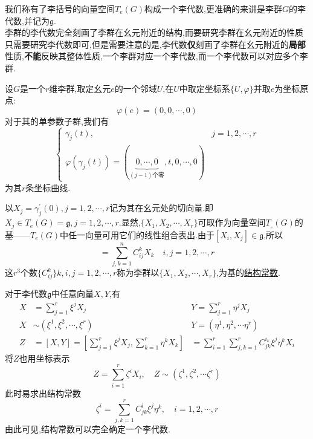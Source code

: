 我们称有了李括号的向量空间$T_e(G)$构成一个李代数,更准确的来讲是李群$G$的李代数,并记为$\mathfrak{g}$.\\
李群的李代数完全刻画了李群在幺元附近的结构,而要研究李群在幺元附近的性质只需要研究李代数即可,但是需要注意的是,李代数\textbf{仅}刻画了李群在幺元附近的\textbf{局部}性质,\textbf{不能}反映其整体性质,一个李群对应一个李代数,而一个李代数可以对应多个李群.
\begin{definition}[结构常数]
    设$G$是一个$r$维李群,取定幺元$e$的一个邻域$U$,在$U$中取定坐标系$\{U,\varphi\}$并取$e$为坐标原点:
    \begin{equation}
        \varphi(e)=(0,0,\cdots,0)
    \end{equation}
    对于其的单参数子群,我们有
    \begin{equation}
        \begin{cases}\gamma_j(t),&j=1,2,\cdots,r\\\varphi(\gamma_j(t))=(\underbrace{0,\cdots,0}_{(j-1)\text{个零}},t,0,\cdots,0)\end{cases}
    \end{equation}
    为其$r$条坐标曲线.
    
    以$X_{j}= \gamma _{j}^{\prime }(0),j= 1, 2, \cdots , r$记为其在幺元处的切向量.即$X_j\in T_e(G) = \mathfrak{g}, j= 1, 2, \cdots , r$.显然,$\{X_1,X_2,\cdots,X_r\}$可取作为向量空间$T_{_e}(G)$的基——$T_{e}(G)$中任一向量可用它们的线性组合表出.由于$[X_i,X_j]\in \mathfrak{g}$,所以
    \begin{equation}
        [X_{i},X_{j}]=\sum_{j,k=1}^{n}C_{ij}^{k}X_{k}\quad i,j=1,2,\cdots,r
    \end{equation}
    这$r^3$个数$\{C_{ij}^k\}k,i,j=1,2,\cdots,r$称为李群以$\{X_1,X_2,\cdots,X_r\}$,为基的\underline{结构常数}.
\end{definition}
对于李代数$\mathfrak{g}$中任意向量$X,Y$,有
\begin{equation}
    \begin{aligned}
        X&=\sum_{j=1}^{r}\xi^{j}X_{j}&Y=\sum_{j=1}^{r}\eta^{j}X_{j}\\
        X&\sim(\xi^{1},\xi^{2},\cdots,\xi^{r})&Y=(\eta^{1},\eta^{2},\cdots\eta^{r})\\
        Z&=[X,Y]=\left[\sum_{j=1}^{r}\xi^{j}X_{j},\sum_{k=1}^{r}\eta^{k}X_{k}\right]&=\sum_{i=1}^{r}\sum_{j,k=1}^{r}C_{jk}^{i_{k}}\xi^{j}\eta^{k}X_{i}
    \end{aligned}
\end{equation}
将$Z$也用坐标表示
\begin{equation}
    Z=\sum_{i=1}^{r}\zeta^{ i}X_{i},\quad Z\sim(\zeta^{ 1},\zeta^{ 2},\cdots\zeta^{ r})
\end{equation}
此时易求出结构常数
\begin{equation}
    \zeta^{i}=\sum_{j,k=1}^{r}C_{jk}^{i}\xi^{j}\eta^{k},\quad i=1,2,\cdots,r
\end{equation}
由此可见,结构常数可以完全确定一个李代数.

